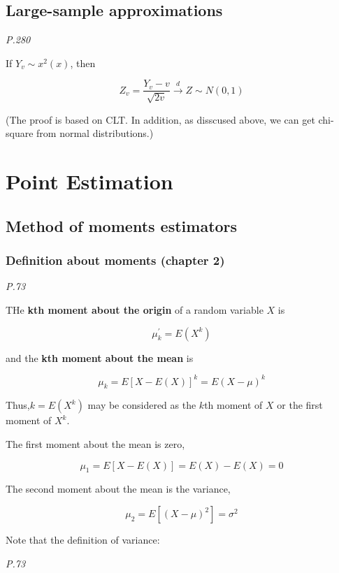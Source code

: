 \documentclass[]{book}
\begin{document}
\hypertarget{large-sample-approximations}{%
\subsection{Large-sample approximations}\label{large-sample-approximations}}

\emph{P.280}

If \(Y_v \sim x^2(x)\), then

\[Z_v =\frac{Y_v-v}{\sqrt{2v}} \xrightarrow{d} Z \sim N(0,1)\]

(The proof is based on CLT. In addition, as disscused above, we can get chi-square from normal distributions.)

\hypertarget{point-estimation}{%
\section{Point Estimation}\label{point-estimation}}

\hypertarget{method-of-moments-estimators}{%
\subsection{Method of moments estimators}\label{method-of-moments-estimators}}

\hypertarget{definition-about-moments-chapter-2}{%
\subsubsection{Definition about moments (chapter 2)}\label{definition-about-moments-chapter-2}}

\emph{P.73}

THe \textbf{kth moment about the origin} of a random variable \(X\) is

\[\mu^{'}_k=E(X^k)\]

and the \textbf{kth moment about the mean} is

\[\mu_k=E[X-E(X)]^k=E(X-\mu)^k\]

Thus,\(k=E(X^k)\) may be considered as the \(k\)th moment of \(X\) or the first moment of \(X^k\).

The first moment about the mean is zero,

\[\mu_1=E[X-E(X)]=E(X)-E(X)=0\]

The second moment about the mean is the variance,

\[\mu_2=E[(X-\mu)^2]=\sigma^2\]

Note that the definition of variance:

\emph{P.73}
\end{document}
